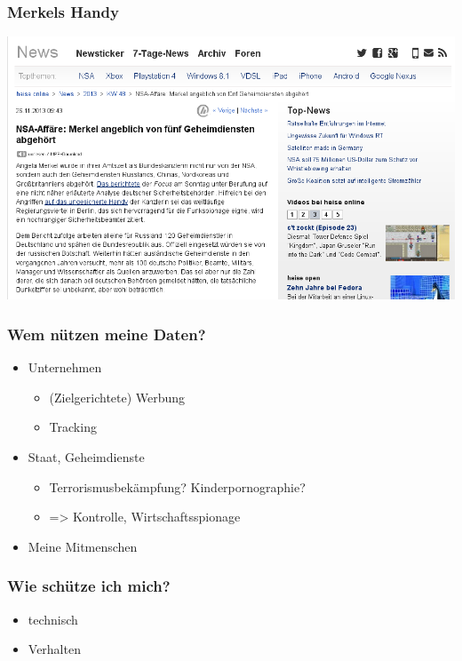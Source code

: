\begin{frame}
    \frametitle{Merkels Handy}
    \includegraphics[height=0.7\textheight]{img/heise-merkel.png}
\end{frame}

\begin{frame}
    \frametitle{Wem nützen meine Daten?}
    \begin{itemize}
      \item<2-> Unternehmen
        \begin{itemize}
          \item<3-> (Zielgerichtete) Werbung
          \item<4-> Tracking
        \end{itemize}
      \item<5-> Staat, Geheimdienste
        \begin{itemize}
          \item<6-> Terrorismusbekämpfung? Kinderpornographie?
          \item<7-> => Kontrolle, Wirtschaftsspionage
        \end{itemize}
      \item<8->Meine Mitmenschen
    \end{itemize}
\end{frame}

\begin{frame}
    \frametitle{Wie schütze ich mich?}
    \begin{itemize}
      \item<1-> technisch
      \item<2-> Verhalten
    \end{itemize}
\end{frame}
